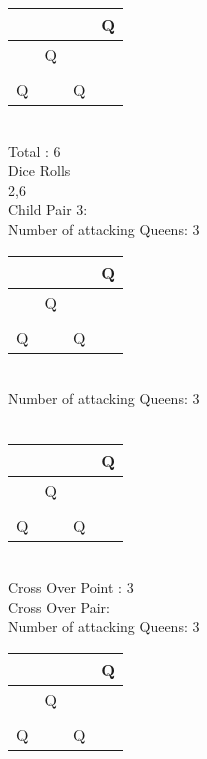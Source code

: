 \documentclass[a4paper,10pt]{article}
\begin{document}
\begin{flushleft}
\begin{flushleft}
\begin{flushleft}
\begin{flushleft}
\begin{flushleft}
\begin{flushleft}
\begin{flushleft}
\begin{flushleft}
\begin{flushleft}
\begin{flushleft}
\begin{flushleft}
\begin{flushleft}
\begin{flushleft}
\begin{flushleft}
\begin{flushleft}
\begin{flushleft}
\begin{flushleft}
\begin{flushleft}
\vspace{5mm}
    \begin{tabular}{| l | l | l | l |}
    \hline
     & & & Q\\ \hline
     & Q & & \\ \hline
     & & & \\ \hline
     Q & & Q & \\ \hline
    \end{tabular}
\break
\\
Total : 6\\
Dice Rolls\\
2,6\\
Child Pair 3:\\
Number of attacking Queens: 3\\
\vspace{5mm}
    \begin{tabular}{| l | l | l | l |}
    \hline
     & & & Q\\ \hline
     & Q & & \\ \hline
     & & & \\ \hline
     Q & & Q & \\ \hline
    \end{tabular}
\break
\\
Number of attacking Queens: 3\\
\\
\vspace{5mm}
    \begin{tabular}{| l | l | l | l |}
    \hline
     & & & Q\\ \hline
     & Q & & \\ \hline
     & & & \\ \hline
     Q & & Q & \\ \hline
    \end{tabular}
\\
\vspace{5mm}
Cross Over Point : 3\\
Cross Over Pair: \\
\break
Number of attacking Queens: 3\\
\vspace{5mm}
    \begin{tabular}{| l | l | l | l |}
    \hline
     & & & Q\\ \hline
     & Q & & \\ \hline
     & & & \\ \hline
     Q & & Q & \\ \hline
    \end{tabular}

\end{flushleft}
\end{flushleft}
\end{flushleft}
\end{flushleft}
\end{flushleft}
\end{flushleft}
\end{flushleft}
\end{flushleft}
\end{flushleft}
\end{flushleft}
\end{flushleft}
\end{flushleft}
\end{flushleft}
\end{flushleft}
\end{flushleft}
\end{flushleft}
\end{flushleft}
\end{flushleft}
\end{document}
